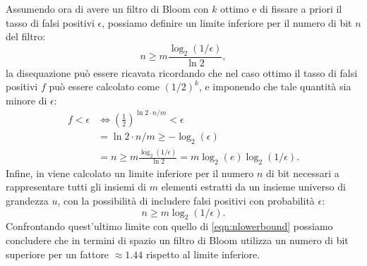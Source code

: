 \documentclass[../../main.tex]{subfiles}
\begin{document}
Assumendo ora di avere un filtro di Bloom con $k$ ottimo e di fissare a priori il tasso di falsi positivi $\epsilon$, possiamo definire un limite inferiore per il numero di bit $n$ del filtro: 
\begin{equation}
    n \geq m \frac{\log_2(1/\epsilon)}{\ln2},
    \label{eqn:nlowerbound}
\end{equation}
la disequazione può essere ricavata ricordando che nel caso ottimo il tasso di falsi positivi $f$ può essere calcolato come $\left(1/2\right)^k$, e imponendo che tale quantità sia minore di $\epsilon$:
\begin{align*}
    f < \epsilon &\Leftrightarrow \left(\frac{1}{2}\right)^{\ln2 \cdot n/m} < \epsilon\\
    &= \ln2 \cdot n/m \geq - \log_2(\epsilon) \\
    &= n \geq m \frac{\log_2(1/\epsilon)}{\ln2} = m \log_2(e) \log_2(1/\epsilon) .
\end{align*}
Infine, in \cite{Broder2005} viene calcolato un limite inferiore per il numero $n$ di bit necessari a rappresentare tutti gli insiemi di $m$ elementi estratti da un insieme universo di grandezza $u$, con la possibilità di includere falsi positivi con probabilità $\epsilon$:
\[n \geq m \log_2(1/\epsilon).\]
Confrontando quest'ultimo limite con quello di \eqref{eqn:nlowerbound} possiamo concludere che in termini di spazio un filtro di Bloom utilizza un numero di bit superiore per un fattore $\approx 1.44$ rispetto al limite inferiore.
\end{document}
